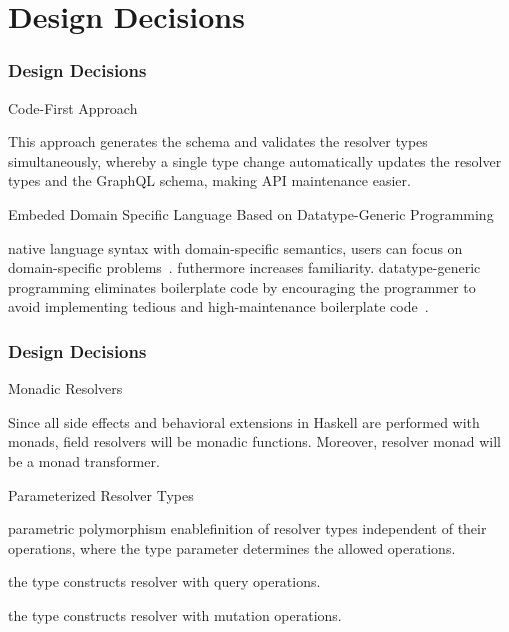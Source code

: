 
\section{Design Decisions} 

\begin{frame}\frametitle{Design Decisions}
\begin{alertblock}{Code-First Approach}  

This approach generates the schema and validates the resolver types simultaneously, whereby a single type change automatically updates the resolver types and the GraphQL schema, making API maintenance easier.

\end{alertblock}

\begin{alertblock}{Embeded Domain Specific Language Based on Datatype-Generic Programming}  

native language syntax with domain-specific semantics, users can focus on domain-specific problems~\cite{edsl-modeling}. futhermore increases familiarity. datatype-generic programming eliminates boilerplate code by encouraging the programmer to avoid implementing tedious and high-maintenance boilerplate code~\cite{scrap-your-boilerplate}.

\end{alertblock}

\end{frame}

\begin{frame}\frametitle{Design Decisions}

\begin{alertblock}{Monadic Resolvers} 

Since all side effects and behavioral extensions in Haskell are performed with monads, field resolvers will be monadic functions. 
Moreover, resolver monad will be a monad transformer. 

\end{alertblock}


\begin{alertblock}{Parameterized Resolver Types}

parametric polymorphism enablefinition of resolver types independent of their operations, where the type parameter determines the allowed operations.  


the type  constructs resolver  with query operations. 
 
the type  constructs resolver  with mutation operations.

\end{alertblock}
\end{frame}